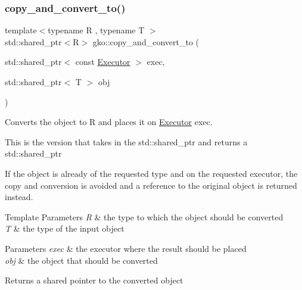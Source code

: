 \subsubsection{\texorpdfstring{copy\+\_\+and\+\_\+convert\+\_\+to()}{copy\_and\_convert\_to()}\hspace{0.1cm}{\footnotesize\ttfamily [3/4]}}
{\footnotesize\ttfamily template$<$typename R , typename T $>$ \\
std\+::shared\+\_\+ptr$<$R$>$ gko\+::copy\+\_\+and\+\_\+convert\+\_\+to (\begin{DoxyParamCaption}\item[{std\+::shared\+\_\+ptr$<$ const \hyperlink{classgko_1_1Executor}{Executor} $>$}]{exec,  }\item[{std\+::shared\+\_\+ptr$<$ T $>$}]{obj }\end{DoxyParamCaption})}



Converts the object to R and places it on \hyperlink{classgko_1_1Executor}{Executor} exec. 

This is the version that takes in the std\+::shared\+\_\+ptr and returns a std\+::shared\+\_\+ptr

If the object is already of the requested type and on the requested executor, the copy and conversion is avoided and a reference to the original object is returned instead.


\begin{DoxyTemplParams}{Template Parameters}
{\em R} & the type to which the object should be converted \\
\hline
{\em T} & the type of the input object\\
\hline
\end{DoxyTemplParams}

\begin{DoxyParams}{Parameters}
{\em exec} & the executor where the result should be placed \\
\hline
{\em obj} & the object that should be converted\\
\hline
\end{DoxyParams}
\begin{DoxyReturn}{Returns}
a shared pointer to the converted object 
\end{DoxyReturn}
\mbox{\label{namespacegko_a0f28847393e540a33fdda8cd80584789}} 
